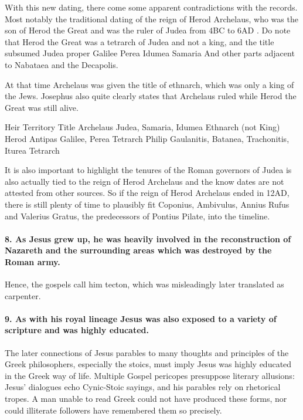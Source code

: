 With this new dating, there come some apparent contradictions with the records.
Most notably the traditional dating of the reign of Herod Archelaus, who was the son of Herod the Great and was the ruler of Judea from 4BC to 6AD .
Do note that Herod the Great was a tetrarch of Judea and not a king, and the title subsumed Judea proper Galilee Perea Idumea Samaria And other parts adjacent to Nabataea and the Decapolis.

At that time Archelaus was given the title of ethnarch, which was only a king of the Jews.
Josephus also quite clearly states that Archelaus ruled while Herod the Great was still alive.

Heir Territory Title Archelaus Judea, Samaria, Idumea Ethnarch (not King) Herod Antipas Galilee, Perea Tetrarch Philip Gaulanitis, Batanea, Trachonitis, Iturea Tetrarch

It is also important to highlight the tenures of the Roman governors of Judea is also actually tied to the reign of Herod Archelaus and the know dates are not attested from other sources.
So if the reign of Herod Archelaus ended in 12AD, there is still plenty of time to plausibly fit Coponius, Ambivulus, Annius Rufus and Valerius Gratus, the predecessors of Pontius Pilate, into the timeline.

\paragraph{8.
As Jesus grew up, he was heavily involved in the reconstruction of Nazareth and the surrounding areas which was destroyed by the Roman army.}\label{par:as-jesus-grew-up-he-was-heavily-involved-in-the-reconstruction-of-nazareth-and-the-surrounding-areas-which-was-destroyed-by-the-roman-army.}

Hence, the gospels call him tecton, which was misleadingly later translated as carpenter.

\paragraph{9.
As with his royal lineage Jesus was also exposed to a variety of scripture and was highly educated.}\label{par:as-with-his-royal-lineage-jesus-was-also-exposed-to-a-variety-of-scripture-and-was-highly-educated.}

The later connections of Jesus parables to many thoughts and principles of the Greek philosophers, especially the stoics, must imply Jesus was highly educated in the Greek way of life.
Multiple Gospel pericopes presuppose literary allusions: Jesus’ dialogues echo Cynic-Stoic sayings, and his parables rely on rhetorical tropes. A man unable to read Greek could not have produced these forms, nor could illiterate followers have remembered them so precisely.

